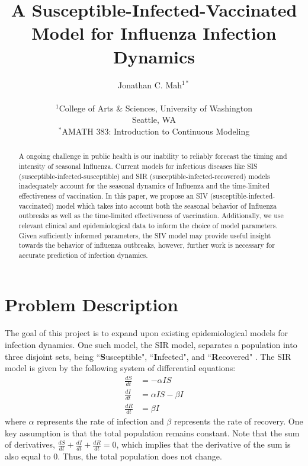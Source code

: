 \documentclass[12pt]{article}
\title{A Susceptible-Infected-Vaccinated Model for Influenza Infection Dynamics}
\author
{Jonathan C. Mah$^{1*}$\\
\\
\footnotesize{$^1$College of Arts \& Sciences, University of Washington}\\
\footnotesize{Seattle, WA}\\
\footnotesize{$^*$AMATH 383: Introduction to Continuous Modeling}\\
}
\date{}
\begin{document}
 


\maketitle 


\begin{abstract}
\noindent  
A ongoing challenge in public health is our inability to reliably forecast the timing and intensity of seasonal Influenza. Current models for infectious diseases like SIS (susceptible-infected-susceptible) and SIR (susceptible-infected-recovered) models inadequately account for the seasonal dynamics of Influenza and the time-limited effectiveness of vaccination. In this paper, we propose an SIV (susceptible-infected-vaccinated) model which takes into account both the seasonal behavior of Influenza outbreaks as well as the time-limited effectiveness of vaccination. Additionally, we use relevant clinical and epidemiological data to inform the choice of model parameters. Given sufficiently informed parameters, the SIV model may provide useful insight towards the behavior of influenza outbreaks, however, further work is necessary for accurate prediction of infection dynamics.
\end{abstract}

\clearpage

\section{Problem Description} 
The goal of this project is to expand upon existing epidemiological models for infection dynamics. One such model, the SIR model, separates a population into three disjoint sets, being ``\textbf{S}usceptible", ``\textbf{I}nfected", and ``\textbf{R}ecovered" \citep{Beretta1995}. The SIR model is given by the following system of differential equations:
\begin{equation} \label{SIR}
\begin{aligned}
\frac{dS}{dt} &= -\alpha I S \\
\frac{dI}{dt} &= \alpha I S - \beta I \\
\frac{dR}{dt} &= \beta I 
\end{aligned}
\end{equation}
where $\alpha$ represents the rate of infection and $\beta$ represents the rate of recovery. One key assumption is that the total population remains constant. Note that the sum of derivatives, $\frac{dS}{dt} + \frac{dI}{dt} + \frac{dR}{dt} = 0$, which implies that the derivative of the sum is also equal to $0$. Thus, the total population does not change. 
\end{document}
